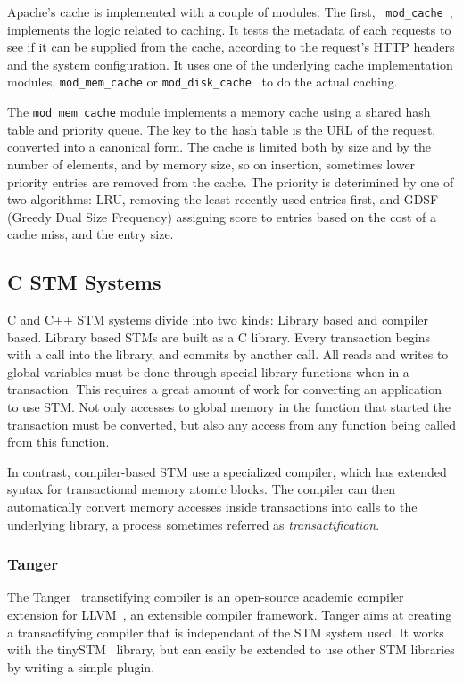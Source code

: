 \documentclass[preprint,natbib,11pt]{sigplanconf}
\begin{document}
Apache's cache is implemented with a couple of modules. The first, {\tt
mod\_cache}~\cite{apache:mod_cache}, implements the logic related to caching. It
tests the metadata of each requests to see if it can be supplied from the cache,
according to the request's HTTP headers and the system configuration. It uses
one of the underlying cache implementation modules, {\tt mod\_mem\_cache} or
{\tt mod\_disk\_cache}~\cite{apache:mod_disk_cache} to do the actual caching.

The {\tt mod\_mem\_cache} module implements a memory cache using a shared hash
table and priority queue. The key to the hash table is the URL of the request,
converted into a canonical form. The cache is limited both by size and by the
number of elements, and by memory size, so on insertion, sometimes lower
priority entries are removed from the cache. The priority is deterimined by one
of two algorithms: LRU, removing the least recently used entries first, and GDSF
(Greedy Dual Size Frequency) assigning score to entries based on the cost of a
cache miss, and the entry size.

\subsection{C STM Systems}
C and C++ STM systems divide into two kinds: Library based and compiler based.
Library based STMs are built as a C library. Every transaction begins with a
call into the library, and commits by another call. All reads and writes to
global variables must be done through special library functions when in a
transaction. This requires a great amount of work for converting an application
to use STM. Not only accesses to global memory in the function that started the
transaction must be converted, but also any access from any function being
called from this function. 

In contrast, compiler-based STM use a specialized compiler, which has extended
syntax for transactional memory atomic blocks. The compiler can then
automatically convert memory accesses inside transactions into calls to the
underlying library, a process sometimes referred as \emph{transactification}. 

\subsubsection{\sc Tanger}
The {\sc Tanger}~\cite{felber2007tanger} transctifying compiler is an
open-source academic compiler extension for LLVM~\cite{LLVM:CGO04}, an
extensible compiler framework.  Tanger aims at creating a transactifying
compiler that is independant of the STM system used. It works with the
tinySTM~\cite{felber2008tinystm} library, but can easily be extended to use
other STM libraries by writing a simple plugin.
\end{document}
